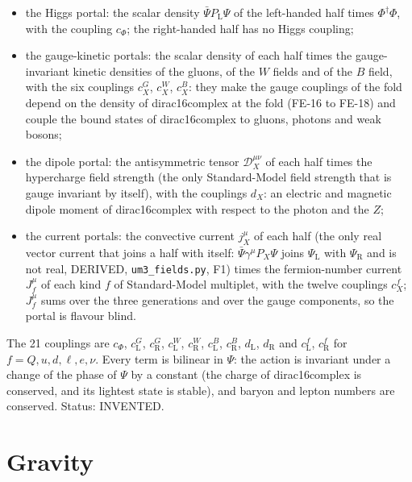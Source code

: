 \documentclass[
  10pt,
]{article}
\providecommand{\tightlist}{%
  \setlength{\itemsep}{0pt}\setlength{\parskip}{0pt}}
\begin{document}
\begin{itemize}
\tightlist
\item
  the Higgs portal: the scalar density \(\bar\Psi P_{\mathrm{L}}\Psi\)
  of the left-handed half times \(\Phi^\dagger\Phi\), with the coupling
  \(c_\Phi\); the right-handed half has no Higgs coupling;
\item
  the gauge-kinetic portals: the scalar density of each half times the
  gauge-invariant kinetic densities of the gluons, of the \(W\) fields
  and of the \(B\) field, with the six couplings \(c^{G}_X\),
  \(c^{W}_X\), \(c^{B}_X\): they make the gauge couplings of the fold
  depend on the density of dirac16complex at the fold (FE-16 to FE-18)
  and couple the bound states of dirac16complex to gluons, photons and
  weak bosons;
\item
  the dipole portal: the antisymmetric tensor \(\mathcal{D}_X^{\mu\nu}\)
  of each half times the hypercharge field strength (the only
  Standard-Model field strength that is gauge invariant by itself), with
  the couplings \(d_X\): an electric and magnetic dipole moment of
  dirac16complex with respect to the photon and the \(Z\);
\item
  the current portals: the convective current \(j_X^\mu\) of each half
  (the only real vector current that joins a half with itself:
  \(\bar\Psi\gamma^\mu P_X\Psi\) joins \(\Psi_{\mathrm{L}}\) with
  \(\Psi_{\mathrm{R}}\) and is not real, DERIVED,
  \texttt{um3\_fields.py}, F1) times the fermion-number current
  \(J_f^\mu\) of each kind \(f\) of Standard-Model multiplet, with the
  twelve couplings \(c^{f}_X\); \(J_f^\mu\) sums over the three
  generations and over the gauge components, so the portal is flavour
  blind.
\end{itemize}

The 21 couplings are \(c_\Phi\), \(c^{G}_{\mathrm{L}}\),
\(c^{G}_{\mathrm{R}}\), \(c^{W}_{\mathrm{L}}\), \(c^{W}_{\mathrm{R}}\),
\(c^{B}_{\mathrm{L}}\), \(c^{B}_{\mathrm{R}}\), \(d_{\mathrm{L}}\),
\(d_{\mathrm{R}}\) and \(c^{f}_{\mathrm{L}}\), \(c^{f}_{\mathrm{R}}\)
for \(f = Q, u, d, \ell, e, \nu\). Every term is bilinear in \(\Psi\):
the action is invariant under a change of the phase of \(\Psi\) by a
constant (the charge of dirac16complex is conserved, and its lightest
state is stable), and baryon and lepton numbers are conserved. Status:
INVENTED.

\hypertarget{gravity-1}{%
\section{Gravity}\label{gravity-1}}
\end{document}
